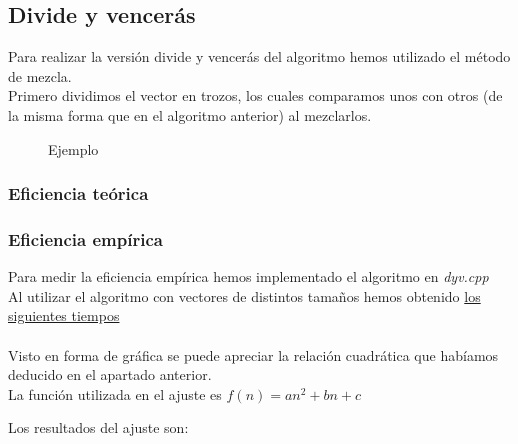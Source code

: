 \newpage

\subsection{Divide y vencerás}
Para realizar la versión divide y vencerás del algoritmo hemos utilizado el método de mezcla.\\

Primero dividimos el vector en trozos, los cuales comparamos unos con otros (de la misma forma que en el algoritmo anterior) al mezclarlos.\\


\begin{figure}[h] 
\centering
	\caption{Ejemplo} 
\end{figure}


\subsubsection{Eficiencia teórica}
\subsubsection{Eficiencia empírica}
Para medir la eficiencia empírica hemos implementado el algoritmo en \textit{dyv.cpp}\\

Al utilizar el algoritmo con vectores de distintos tamaños hemos obtenido \hyperref[tabla_comp]{los siguientes tiempos}\\\\

Visto en forma de gráfica se puede apreciar la relación cuadrática que habíamos deducido en el apartado anterior.\\

La función utilizada en el ajuste es $f(n) = an^2 + bn + c$

Los resultados del ajuste son:\\

